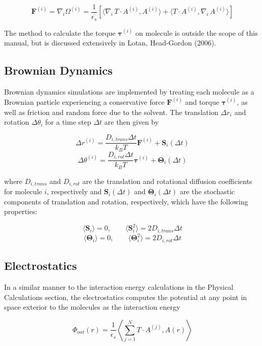 \[ \textbf{F}^{(i)} = \nabla_i \Omega^{(i)}=\frac{1}{\epsilon_s} [ \langle \nabla_i \,T \cdot A^{(i) } ,  A^{(i) } \rangle +  \langle T \cdot A^{(i) } ,   \nabla_i \, A^{(i) } \rangle ]\]


The method to calculate the torque $\boldsymbol{\tau}^{(i)}$ on molecule is outside the scope of this manual, but is discussed extensively in Lotan, Head-Gordon (2006).

\subsection{Brownian Dynamics}

Brownian dynamics simulations are implemented by treating each molecule as a Brownian particle experiencing a conservative force $\textbf{F}^{(i)}$ and torque $\boldsymbol{\tau}^{(i)}$, as well as friction and random force due to the solvent. The translation $\Delta r_i$ and rotation $\Delta \theta_i$ for a time step $\Delta t$ are then given by

\[\Delta r^{(i)} = \frac{D_{i, trans} \Delta t}{k_B T} \textbf{F}^{(i)} + \textbf{S}_i(\Delta t)\]
\[\Delta \theta^{(i)} = \frac{D_{i, rot} \Delta t}{k_B T} \boldsymbol{\tau}^{(i)} + \boldsymbol{\Theta}_i(\Delta t)\]

where $D_{i, trans}$ and $D_{i, rot}$ are the translation and rotational diffusion coefficients for molecule $i$, respectively and $\textbf{S}_i(\Delta t)$ and $\boldsymbol{\Theta}_i(\Delta t)$ are the stochastic components of translation and rotation, respectively, which have the following properties:

\[\langle \textbf{S}_i \rangle=0, \qquad \langle \textbf{S}_i^2 \rangle=2D_{i, trans}\Delta t\]
\[\langle \boldsymbol{\Theta}_i \rangle=0, \qquad \langle \boldsymbol{\Theta}_i^2 \rangle=2D_{i, rot}\Delta t\]

\subsection{Electrostatics}

In a similar manner to the interaction energy calculations in the Physical Calculations section, the electrostatics computes the potential at any point in space exterior to the molecules as the interaction energy 

\[\Phi_{out}(r)= \frac{1}{\epsilon_s} \left \langle \sum_{j = 1}^N  T \cdot A^{(j) } ,  A(r)  \right \rangle \]

